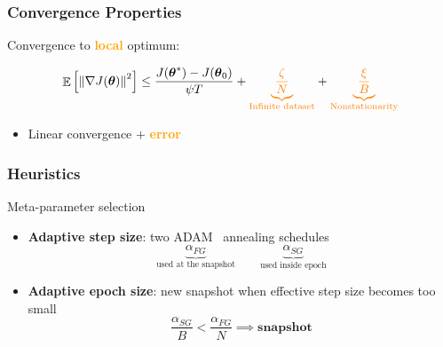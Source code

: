 \documentclass[aspectratio=169]{beamer}
\newcommand{\enb}[1]{\textcolor{poliblue1}{\textbf{#1}}}
\newcommand{\eno}[1]{\textcolor{orange}{\textbf{#1}}}
\DeclareMathOperator*{\EV}{\mathbb{E}}
\newcommand{\EVV}[2][\ppvect \in \ppspace]{\EV_{#1}\left[{#2}\right]}
\newcommand{\norm}[2][\infty]{\left\|#2\right\|_{#1}}
\newcommand{\vtheta}{\boldsymbol{\theta}}
\begin{document}
\begin{frame} 
\frametitle{Convergence Properties} 
Convergence to \eno{local} optimum:

\Large{
\begin{equation*}
	\EVV[]
	{\norm[]{\nabla J(\vtheta)}^2} 
	\leq
	\frac{J(\vtheta^*)-J(\vtheta_0)}{\psi T} +
	\textcolor{orange}{\underbrace{\frac{\zeta}{N}}_{\text{Infinite dataset}}}
	+\textcolor{orange}{\underbrace{\frac{\xi}{B}}_{\text{Nonstationarity}}}
\end{equation*}
}

\begin{itemize}
	\item Linear convergence $+$ \eno{error}~\citep [similar to][]{harikandeh2015stopwasting}
\end{itemize}

\end{frame}

\begin{frame} 
\frametitle{Heuristics} 
Meta-parameter selection

\begin{itemize}
	\item \enb{Adaptive step size}: two ADAM~\citep{kingma2014adam} annealing schedules
	 \begin{equation*}
	 	\underbrace{\alpha_{FG}}_{\text{used at the snapshot}} \qquad \underbrace{\alpha_{SG}}_{\text{used inside epoch}}
	 \end{equation*}
	\item \enb{Adaptive epoch size}: new snapshot when effective step size becomes too small
	\begin{equation*}
		\frac{\alpha_{SG}}{B} < \frac{\alpha_{FG}}{N} \implies \textbf{snapshot}
	\end{equation*}
\end{itemize}

\end{frame}
\end{document}
